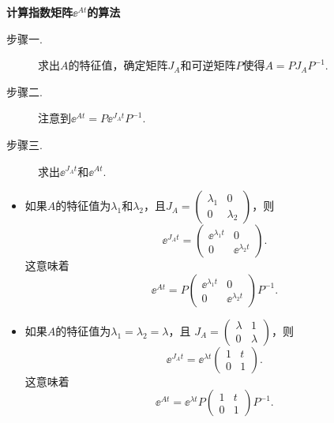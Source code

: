 \begin{mybox}
  {\bfseries 计算指数矩阵$\ee^{At}$的算法}
  \begin{description}
    \item[步骤一.] 求出$A$的特征值，确定矩阵$J_A$和可逆矩阵$P$使得$A=PJ_AP^{-1}$.
    \item[步骤二.] 注意到$\ee^{At}=P\ee^{J_At}P^{-1}$.
    \item[步骤三.] 求出$\ee^{J_At}$和$\ee^{At}$.
  \end{description}
  \begin{itemize}
    \item 如果$A$的特征值为$\lambda_1$和$\lambda_2$，且$J_A=\begin{pmatrix}
          \lambda_1 & 0 \\
          0 & \lambda_2
        \end{pmatrix}$，则
        \[
          \ee^{J_At} = \begin{pmatrix}
            \ee^{\lambda_1t} & 0 \\
            0 & \ee^{\lambda_2t}
          \end{pmatrix}.
        \]
        这意味着
        \[
          \ee^{At} = P\begin{pmatrix}
            \ee^{\lambda_1t} & 0 \\
            0 & \ee^{\lambda_2t}
          \end{pmatrix}P^{-1}.
        \]
    \item 如果$A$的特征值为$\lambda_1=\lambda_2=\lambda$，且
        $J_A=\begin{pmatrix}
          \lambda & 1 \\
          0 & \lambda
        \end{pmatrix}$，则
        \[
          \ee^{J_At} = \ee^{\lambda t}\begin{pmatrix}
            1 & t \\
            0 & 1
          \end{pmatrix}.
        \]
        这意味着
        \[
          \ee^{At} = \ee^{\lambda t}P\begin{pmatrix}
            1 & t \\
            0 & 1
          \end{pmatrix}P^{-1}.
        \]
  \end{itemize}
\end{mybox}

